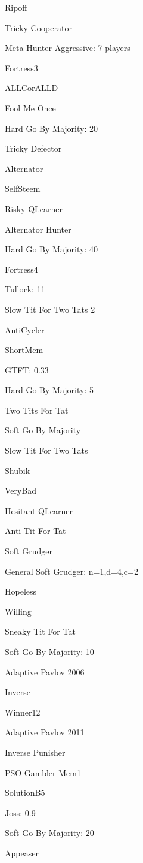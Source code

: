 \item Ripoff
\item Tricky Cooperator
\item Meta Hunter Aggressive: 7 players
\item Fortress3
\item ALLCorALLD
\item Fool Me Once
\item Hard Go By Majority: 20
\item Tricky Defector
\item Alternator
\item SelfSteem
\item Risky QLearner
\item Alternator Hunter
\item Hard Go By Majority: 40
\item Fortress4
\item Tullock: 11
\item Slow Tit For Two Tats 2
\item AntiCycler
\item ShortMem
\item GTFT: 0.33
\item Hard Go By Majority: 5
\item Two Tits For Tat
\item Soft Go By Majority
\item Slow Tit For Two Tats
\item Shubik
\item VeryBad
\item Hesitant QLearner
\item Anti Tit For Tat
\item Soft Grudger
\item General Soft Grudger: n=1,d=4,c=2
\item Hopeless
\item Willing
\item Sneaky Tit For Tat
\item Soft Go By Majority: 10
\item Adaptive Pavlov 2006
\item Inverse
\item Winner12
\item Adaptive Pavlov 2011
\item Inverse Punisher
\item PSO Gambler Mem1
\item SolutionB5
\item Joss: 0.9
\item Soft Go By Majority: 20
\item Appeaser
